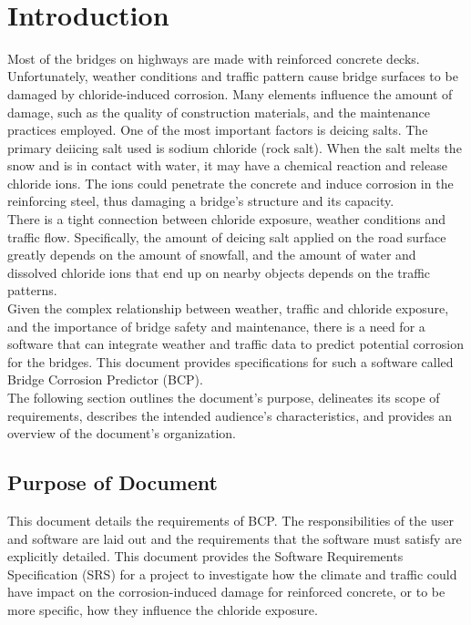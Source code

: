 \documentclass[12pt]{article}
\begin{document}
\break
~\newpage


\section{Introduction}
Most of the bridges on highways are made with reinforced concrete decks. Unfortunately, weather conditions and traffic pattern cause bridge surfaces to be damaged by chloride-induced corrosion. Many elements influence the amount of damage, such as the quality of construction materials, and the maintenance practices employed. One of the most important factors is deicing salts. The primary deiicing salt used is sodium chloride (rock salt). When the salt melts the snow and is in contact with water, it may have a chemical reaction and release chloride ions. The ions could penetrate the concrete and induce corrosion in the reinforcing steel, thus damaging a bridge's structure and its capacity. \\
There is a tight connection between chloride exposure, weather conditions and traffic flow. Specifically, the amount of deicing salt applied on the road surface greatly depends on the amount of snowfall, and the amount of water and dissolved chloride ions that end up on nearby objects depends on the traffic patterns.\\
Given the complex relationship between weather, traffic and chloride exposure, and the importance of bridge safety and maintenance, there is a need for a software that can integrate weather and traffic data to predict potential corrosion for the bridges. This document provides specifications for such a software called Bridge Corrosion Predictor (BCP). \\
The following section outlines the document's purpose, delineates its scope of requirements, describes the intended audience's characteristics, and provides an overview of the document's organization.

\subsection{Purpose of Document}
This document details the requirements of BCP. The
responsibilities of the user and software are laid out and the requirements that the software must satisfy are explicitly detailed. This document provides the Software Requirements Specification (SRS) for a project to investigate how the climate and traffic could have impact on the corrosion-induced damage for reinforced concrete, or to be more specific, how they influence the chloride exposure. 
\end{document}

